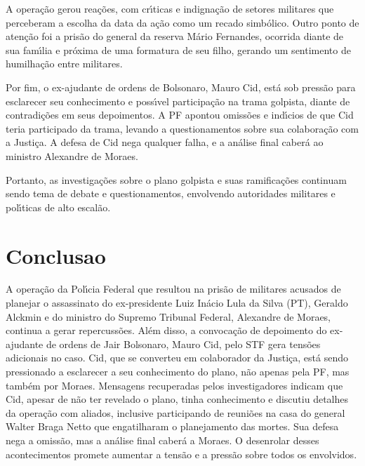 \documentclass[article,11pt,oneside,a4paper,brazil,sumario=tradicional]{abntex2}%
\begin{document}
A opera\c{c}\~ao gerou rea\c{c}\~oes, com cr{\'\i}ticas e indigna\c{c}\~ao de setores militares que perceberam a escolha da data da a\c{c}\~ao como um recado simb\'olico. Outro ponto de aten\c{c}\~ao foi a pris\~ao do general da reserva M\'ario Fernandes, ocorrida diante de sua fam{\'\i}lia e pr\'oxima de uma formatura de seu filho, gerando um sentimento de humilha\c{c}\~ao entre militares.

Por fim, o ex-ajudante de ordens de Bolsonaro, Mauro Cid, est\'a sob press\~ao para esclarecer seu conhecimento e poss{\'\i}vel participa\c{c}\~ao na trama golpista, diante de contradi\c{c}\~oes em seus depoimentos. A PF apontou omiss\~oes e ind{\'\i}cios de que Cid teria participado da trama, levando a questionamentos sobre sua colabora\c{c}\~ao com a Justi\c{c}a. A defesa de Cid nega qualquer falha, e a an\'alise final caber\'a ao ministro Alexandre de Moraes.

Portanto, as investiga\c{c}\~oes sobre o plano golpista e suas ramifica\c{c}\~oes continuam sendo tema de debate e questionamentos, envolvendo autoridades militares e pol{\'\i}ticas de alto escal\~ao.

%
\section{Conclusao}%
\label{sec:Conclusao}%
A opera\c{c}\~ao da Pol{\'\i}cia Federal que resultou na pris\~ao de militares acusados de planejar o assassinato do ex-presidente Luiz In\'acio Lula da Silva (PT), Geraldo Alckmin e do ministro do Supremo Tribunal Federal, Alexandre de Moraes, continua a gerar repercuss\~oes. Al\'em disso, a convoca\c{c}\~ao de depoimento do ex-ajudante de ordens de Jair Bolsonaro, Mauro Cid, pelo STF gera tens\~oes adicionais no caso. Cid, que se converteu em colaborador da Justi\c{c}a, est\'a sendo pressionado a esclarecer a seu conhecimento do plano, n\~ao apenas pela PF, mas tamb\'em por Moraes. Mensagens recuperadas pelos investigadores indicam que Cid, apesar de n\~ao ter revelado o plano, tinha conhecimento e discutiu detalhes da opera\c{c}\~ao com aliados, inclusive participando de reuni\~oes na casa do general Walter Braga Netto que engatilharam o planejamento das mortes. Sua defesa nega a omiss\~ao, mas a an\'alise final caber\'a a Moraes. O desenrolar desses acontecimentos promete aumentar a tens\~ao e a press\~ao sobre todos os envolvidos.

%
%
\end{document}
